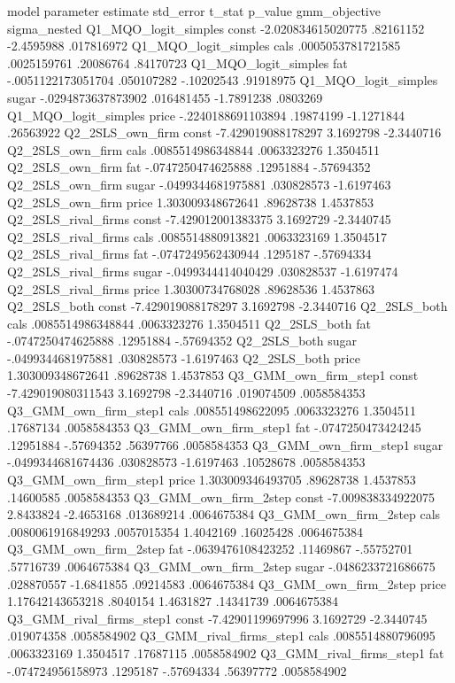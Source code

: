 model	parameter	estimate	std_error	t_stat	p_value	gmm_objective	sigma_nested
Q1_MQO_logit_simples	const	-2.020834615020775	.82161152	-2.4595988	.017816972		
Q1_MQO_logit_simples	cals	.0005053781721585	.0025159761	.20086764	.84170723		
Q1_MQO_logit_simples	fat	-.0051122173051704	.050107282	-.10202543	.91918975		
Q1_MQO_logit_simples	sugar	-.0294873637873902	.016481455	-1.7891238	.0803269		
Q1_MQO_logit_simples	price	-.2240188691103894	.19874199	-1.1271844	.26563922		
Q2_2SLS_own_firm	const	-7.429019088178297	3.1692798	-2.3440716			
Q2_2SLS_own_firm	cals	.0085514986348844	.0063323276	1.3504511			
Q2_2SLS_own_firm	fat	-.0747250474625888	.12951884	-.57694352			
Q2_2SLS_own_firm	sugar	-.0499344681975881	.030828573	-1.6197463			
Q2_2SLS_own_firm	price	1.303009348672641	.89628738	1.4537853			
Q2_2SLS_rival_firms	const	-7.429012001383375	3.1692729	-2.3440745			
Q2_2SLS_rival_firms	cals	.0085514880913821	.0063323169	1.3504517			
Q2_2SLS_rival_firms	fat	-.0747249562430944	.1295187	-.57694334			
Q2_2SLS_rival_firms	sugar	-.0499344414040429	.030828537	-1.6197474			
Q2_2SLS_rival_firms	price	1.30300734768028	.89628536	1.4537863			
Q2_2SLS_both	const	-7.429019088178297	3.1692798	-2.3440716			
Q2_2SLS_both	cals	.0085514986348844	.0063323276	1.3504511			
Q2_2SLS_both	fat	-.0747250474625888	.12951884	-.57694352			
Q2_2SLS_both	sugar	-.0499344681975881	.030828573	-1.6197463			
Q2_2SLS_both	price	1.303009348672641	.89628738	1.4537853			
Q3_GMM_own_firm_step1	const	-7.429019080311543	3.1692798	-2.3440716	.019074509	.0058584353	
Q3_GMM_own_firm_step1	cals	.008551498622095	.0063323276	1.3504511	.17687134	.0058584353	
Q3_GMM_own_firm_step1	fat	-.0747250473424245	.12951884	-.57694352	.56397766	.0058584353	
Q3_GMM_own_firm_step1	sugar	-.0499344681674436	.030828573	-1.6197463	.10528678	.0058584353	
Q3_GMM_own_firm_step1	price	1.303009346493705	.89628738	1.4537853	.14600585	.0058584353	
Q3_GMM_own_firm_2step	const	-7.009838334922075	2.8433824	-2.4653168	.013689214	.0064675384	
Q3_GMM_own_firm_2step	cals	.0080061916849293	.0057015354	1.4042169	.16025428	.0064675384	
Q3_GMM_own_firm_2step	fat	-.0639476108423252	.11469867	-.55752701	.57716739	.0064675384	
Q3_GMM_own_firm_2step	sugar	-.0486233721686675	.028870557	-1.6841855	.09214583	.0064675384	
Q3_GMM_own_firm_2step	price	1.17642143653218	.8040154	1.4631827	.14341739	.0064675384	
Q3_GMM_rival_firms_step1	const	-7.42901199697996	3.1692729	-2.3440745	.019074358	.0058584902	
Q3_GMM_rival_firms_step1	cals	.0085514880796095	.0063323169	1.3504517	.17687115	.0058584902	
Q3_GMM_rival_firms_step1	fat	-.074724956158973	.1295187	-.57694334	.56397772	.0058584902	
